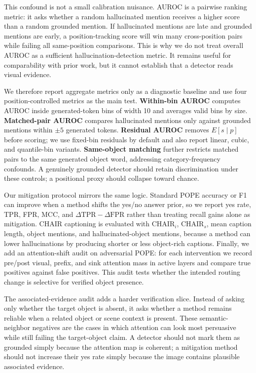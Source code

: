 \documentclass[letterpaper]{article} \usepackage[submission]{aaai2027}  \usepackage[hyphens]{url}  \usepackage{graphicx} \urlstyle{rm} \def\UrlFont{\rm}  \usepackage{natbib}  \usepackage{caption} \frenchspacing
\begin{document}
This confound is not a small calibration nuisance. AUROC is a pairwise ranking metric: it asks whether a random hallucinated mention receives a higher score than a random grounded mention. If hallucinated mentions are late and grounded mentions are early, a position-tracking score will win many cross-position pairs while failing all same-position comparisons. This is why we do not treat overall AUROC as a sufficient hallucination-detection metric. It remains useful for comparability with prior work, but it cannot establish that a detector reads visual evidence.

We therefore report aggregate metrics only as a diagnostic baseline and use four position-controlled metrics as the main test. \textbf{Within-bin AUROC} computes AUROC inside generated-token bins of width 10 and averages valid bins by size. \textbf{Matched-pair AUROC} compares hallucinated mentions only against grounded mentions within $\pm5$ generated tokens. \textbf{Residual AUROC} removes $E[s\mid p]$ before scoring; we use fixed-bin residuals by default and also report linear, cubic, and quantile-bin variants. \textbf{Same-object matching} further restricts matched pairs to the same generated object word, addressing category-frequency confounds. A genuinely grounded detector should retain discrimination under these controls; a positional proxy should collapse toward chance.

Our mitigation protocol mirrors the same logic. Standard POPE accuracy or F1 can improve when a method shifts the yes/no answer prior, so we report yes rate, TPR, FPR, MCC, and $\Delta\mathrm{TPR}-\Delta\mathrm{FPR}$ rather than treating recall gains alone as mitigation. CHAIR captioning is evaluated with CHAIR$_i$, CHAIR$_s$, mean caption length, object mentions, and hallucinated-object mentions, because a method can lower hallucinations by producing shorter or less object-rich captions. Finally, we add an attention-shift audit on adversarial POPE: for each intervention we record pre/post visual, prefix, and sink attention mass in active layers and compare true positives against false positives. This audit tests whether the intended routing change is selective for verified object presence.

The associated-evidence audit adds a harder verification slice. Instead of asking only whether the target object is absent, it asks whether a method remains reliable when a related object or scene context is present. These semantic-neighbor negatives are the cases in which attention can look most persuasive while still failing the target-object claim. A detector should not mark them as grounded simply because the attention map is coherent; a mitigation method should not increase their yes rate simply because the image contains plausible associated evidence.
\end{document}
